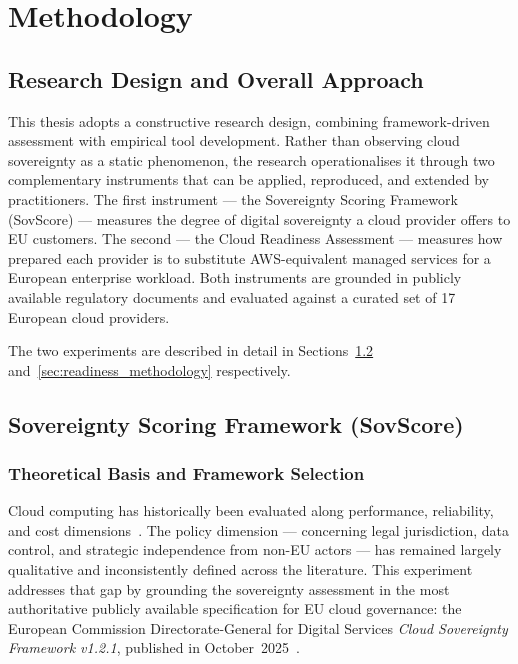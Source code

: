 \chapter{Methodology}
\label{ch:methodology}

\section{Research Design and Overall Approach}
\label{sec:research_design}

This thesis adopts a constructive research design, combining framework-driven assessment with empirical tool development. Rather than observing cloud sovereignty as a static phenomenon, the research operationalises it through two complementary instruments that can be applied, reproduced, and extended by practitioners. The first instrument — the Sovereignty Scoring Framework (SovScore) — measures the degree of digital sovereignty a cloud provider offers to EU customers. The second — the Cloud Readiness Assessment — measures how prepared each provider is to substitute AWS-equivalent managed services for a European enterprise workload. Both instruments are grounded in publicly available regulatory documents and evaluated against a curated set of 17 European cloud providers.

The two experiments are described in detail in Sections~\ref{sec:sovscore_methodology} and~\ref{sec:readiness_methodology} respectively.


\section{Sovereignty Scoring Framework (SovScore)}
\label{sec:sovscore_methodology}

\subsection{Theoretical Basis and Framework Selection}

Cloud computing has historically been evaluated along performance, reliability, and cost dimensions~\cite{armbrust2010view, NIST_SP800145_2011}. The policy dimension — concerning legal jurisdiction, data control, and strategic independence from non-EU actors — has remained largely qualitative and inconsistently defined across the literature. This experiment addresses that gap by grounding the sovereignty assessment in the most authoritative publicly available specification for EU cloud governance: the European Commission Directorate-General for Digital Services \textit{Cloud Sovereignty Framework v1.2.1}, published in October~2025~\cite{EC_DIGIT_CloudSovereignty_2025}.

